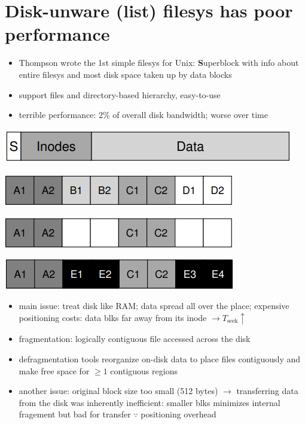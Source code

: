 \section*{Disk-unware (list) filesys has poor performance}
\begin{itemize}
\item Thompson wrote the 1st simple filesys for Unix: \textbf{S}uperblock with info about entire filesys and most disk space taken up by data blocks
\item support files and directory-based hierarchy, easy-to-use
\item terrible performance: 2\% of overall disk bandwidth; worse over time
\end{itemize}
\begin{minipage}{.5\linewidth}
  \includegraphics[width=\linewidth]{imgs/ffs_list1}
\end{minipage}
\begin{minipage}{.5\linewidth}
  \includegraphics[width=\linewidth]{imgs/ffs_list2}
\end{minipage}
\begin{minipage}{.5\linewidth}
  \includegraphics[width=\linewidth]{imgs/ffs_list3}
\end{minipage}
\begin{minipage}{.5\linewidth}
  \includegraphics[width=\linewidth]{imgs/ffs_list4}
\end{minipage}
\begin{itemize}
\item main issue: treat disk like RAM; data spread all over the place; expensive positioning costs: data blks far away from its inode $\to T_{\text{seek}} \uparrow$
\item fragmentation: logically contiguous file accessed across the disk
\item defragmentation tools reorganize on-disk data to place files contiguously and make free space for $\geq 1$ contiguous regions
\item another issue: original block size too small (512 bytes) $\to$ transferring data from the disk was inherently inefficient: smaller blks minimizes internal fragement but bad for transfer $\because$ positioning overhead
\end{itemize}
